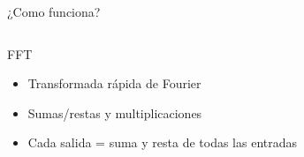\begin{frame}{¿Como funciona?}
  \begin{columns}[T]
    \begin{column}{.5\textwidth}
    \end{column}
    
    \begin{column}{.5\textwidth}
    \end{column}
  \end{columns}
  
  
\end{frame}

\begin{frame}{FFT}
  \Fontit
  \begin{itemize}
    \item<1-> Transformada rápida de Fourier
    \item<2-> Sumas/restas y multiplicaciones
    \item<3-> Cada salida = suma y resta de todas las entradas 
  \end{itemize}
  
  \vfill
  
      
\end{frame}

